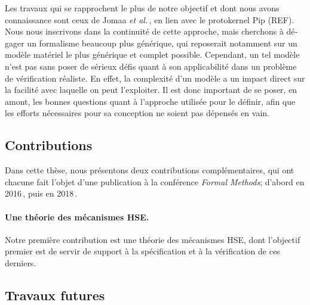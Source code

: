 \begin{otherlanguage}{french}
  Les travaux qui se rapprochent le plus de notre objectif et dont nous avons
  connaissance sont ceux de Jomaa \emph{et al.}\,\cite{jomaa2016mmu}, en lien
  avec le protokernel Pip (REF).
  Nous nous inscrivons dans la continuité de cette approche, mais cherchons à
  dégager un formalisme beaucoup plus générique, qui reposerait notamment sur un
  modèle matériel le plus générique et complet possible.
  Cependant, un tel modèle n’est pas sans poser de sérieux défis quant à son
  applicabilité dans un problème de vérification réaliste.
  En effet, la complexité d’un modèle a un impact direct sur la facilité avec
  laquelle on peut l’exploiter.
  Il est donc important de se poser, en amont, les bonnes
  questions quant à l’approche utilisée pour le définir, afin que les efforts
  nécessaires pour sa conception ne soient pas dépensés en vain.

  \subsection*{Contributions}

  Dans cette thèse, nous présentons deux contributions complémentaires, qui ont
  chacune fait l’objet d’une publication à la conférence \emph{Formal Methods};
  d’abord en 2016\,\cite{letan2016speccert}, puis en
  2018\,\cite{letan2018freespec}.

  \paragraph{Une théorie des mécanismes HSE.}
  Notre première contribution est une théorie des mécanismes HSE, dont
  l’objectif premier est de servir de support à la spécification et à la
  vérification de ces derniers.

  \subsection*{Travaux futures}
\end{otherlanguage}
